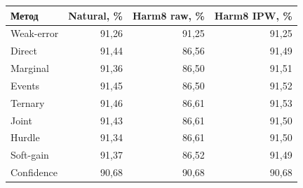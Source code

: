 \begin{tabular}{lrrr}
\toprule
Метод & Natural, \% & Harm8 raw, \% & Harm8 IPW, \% \\
\midrule
Weak-error & 91{,}26 & 91{,}25 & 91{,}25 \\
Direct & 91{,}44 & 86{,}56 & 91{,}49 \\
Marginal & 91{,}36 & 86{,}50 & 91{,}51 \\
Events & 91{,}45 & 86{,}50 & 91{,}52 \\
Ternary & 91{,}46 & 86{,}61 & 91{,}53 \\
Joint & 91{,}43 & 86{,}61 & 91{,}50 \\
Hurdle & 91{,}34 & 86{,}61 & 91{,}50 \\
Soft-gain & 91{,}37 & 86{,}52 & 91{,}49 \\
Confidence & 90{,}68 & 90{,}68 & 90{,}68 \\
\bottomrule
\end{tabular}
